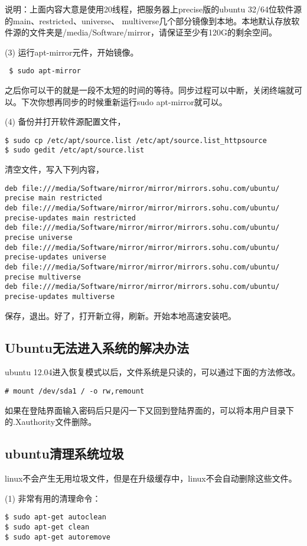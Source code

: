 说明：上面内容大意是使用20线程，把服务器上precise版的ubuntu 32/64位软件源的main、restricted、universe、 multiverse几个部分镜像到本地。本地默认存放软件源的文件夹是/media/Software/mirror，请保证至少有120G的剩余空间。

(3) 运行apt-mirror元件，开始镜像。

\verb" $ sudo apt-mirror"

之后你可以干的就是一段不太短的时间的等待。同步过程可以中断，关闭终端就可以。下次你想再同步的时候重新运行sudo apt-mirror就可以。

(4) 备份并打开软件源配置文件，
\begin{verbatim}
$ sudo cp /etc/apt/source.list /etc/apt/source.list_httpsource
$ sudo gedit /etc/apt/source.list
\end{verbatim}

清空文件，写入下列内容，
\begin{verbatim}
deb file:///media/Software/mirror/mirror/mirrors.sohu.com/ubuntu/ precise main restricted
deb file:///media/Software/mirror/mirror/mirrors.sohu.com/ubuntu/ precise-updates main restricted
deb file:///media/Software/mirror/mirror/mirrors.sohu.com/ubuntu/ precise universe
deb file:///media/Software/mirror/mirror/mirrors.sohu.com/ubuntu/ precise-updates universe
deb file:///media/Software/mirror/mirror/mirrors.sohu.com/ubuntu/ precise multiverse
deb file:///media/Software/mirror/mirror/mirrors.sohu.com/ubuntu/ precise-updates multiverse
\end{verbatim}

保存，退出。好了，打开新立得，刷新。开始本地高速安装吧。

\subsection{Ubuntu无法进入系统的解决办法}
ubuntu 12.04进入恢复模式以后，文件系统是只读的，可以通过下面的方法修改。

\verb"# mount /dev/sda1 / -o rw,remount"

如果在登陆界面输入密码后只是闪一下又回到登陆界面的，可以将本用户目录下的.Xauthority文件删除。

\subsection{ubuntu清理系统垃圾}
linux不会产生无用垃圾文件，但是在升级缓存中，linux不会自动删除这些文件。

(1) 非常有用的清理命令：
\begin{verbatim} 
$ sudo apt-get autoclean
$ sudo apt-get clean
$ sudo apt-get autoremove
\end{verbatim}


